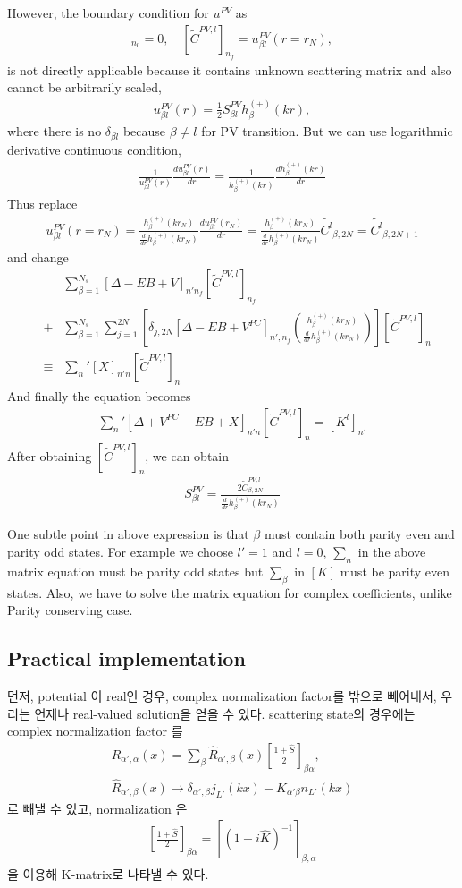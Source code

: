 \documentclass[10pt]{book}
\newcommand{\bea}{\begin{eqnarray}}
\newcommand{\eea}{\end{eqnarray}}
\newcommand{\no}{\nonumber \\}
\begin{document}
However, the boundary condition for $u^{PV}$ as   
\bea 
[\tilde{C}^{PV,l}]_{n_0}=0, \quad [\tilde{C}^{PV,l}]_{n_f}=u^{PV}_{\beta l}(r=r_N),
\eea 
is not directly applicable because it contains unknown scattering matrix
and also cannot be arbitrarily scaled,
\bea 
u^{PV}_{\beta l}(r)=\frac{1}{2}S^{PV}_{\beta l} h^{(+)}_{\beta}(kr),
\eea 
where there is no $\delta_{\beta l}$ because $\beta\neq l$ for PV transition.
But we can use logarithmic derivative continuous condition,
\bea 
\frac{1}{u^{PV}_{\beta l}(r)}\frac{d u^{PV}_{\beta l}(r)}{dr}
=\frac{1}{ h^{(+)}_{\beta}(kr)}
 \frac{d h^{(+)}_{\beta}(kr)}{dr}
\eea 
Thus replace
\bea 
u^{PV}_{\beta l}(r=r_N)=\frac{h^{(+)}_{\beta}(kr_N)  }{ \frac{d }{dr}h^{(+)}_{\beta}(kr_N)} 
                       \frac{d u^{PV}_{\beta l}(r_N)}{dr}
                       =\frac{h^{(+)}_{\beta}(kr_N)  }{ \frac{d }{dr}h^{(+)}_{\beta}(kr_N)}
                       \tilde{C^l}_{\beta,2N} =\tilde{C^l}_{\beta,2N+1} 
\eea 
and change 
\bea 
& &\sum_{\beta=1}^{N_{s}}[\Delta -E B +V]_{n'n_f}[\tilde{C}^{PV,l}]_{n_f} \no 
&+&\sum_{\beta=1}^{N_s}\sum_{j=1}^{2N} \left[ \delta_{j,2N}
   [\Delta-E B+V^{PC}]_{n',n_f} 
   \left(\frac{h^{(+)}_{\beta}(kr_N)  }{ \frac{d }{dr}h^{(+)}_{\beta}(kr_N)}\right) 
   \right] 
   [\tilde{C}^{PV,l}]_{n} \no 
&\equiv& {\sum_{n}}'[X]_{n'n}[\tilde{C}^{PV,l}]_{n}   
\eea 
And finally the equation becomes
\bea 
{\sum_n}' [\Delta+V^{PC}- E B+X]_{n'n}[\tilde{C}^{PV,l}]_{n}=[K^l]_{n'}
\eea 
After obtaining $[\tilde{C}^{PV,l}]_{n}$, we can obtain 
\bea 
S^{PV}_{\beta l}=\frac{ 2 \tilde{C}^{PV,l}_{\beta,2N} }{ \frac{d }{dr}h^{(+)}_{\beta}(kr_N)}
\eea 

One subtle point in above expression is that $\beta$ must contain 
both parity even and parity odd states. For example we choose
$l'=1$ and $l=0$, $\sum_{n}$ in the above matrix equation 
must be parity odd states but $\sum_{\beta}$ in $[K]$ must be parity even states.
Also, we have to solve the matrix equation for complex coefficients, unlike Parity conserving case.

\subsection{Practical implementation }
먼저, potential 이 real인 경우, complex normalization factor를 밖으로 빼어내서, 
우리는 언제나 real-valued solution을 얻을 수 있다. scattering state의 경우에는 complex 
normalization factor 를 
\bea
\label{spline:interp} 
R_{\alpha',\alpha}(x)=\sum_{\beta} \hat{R}_{\alpha',\beta}(x)[\frac{1+\hat{S}}{2}]_{\beta\alpha},
\no 
\hat{R}_{\alpha',\beta}(x)\to \delta_{\alpha',\beta} j_{L'}(kx)
                             -\hat{K}_{\alpha'\beta} n_{L'}(kx) 
\eea 
로 빼낼 수 있고, normalization 은 
\bea 
\label{spline:SK}
[\frac{1+\hat{S}}{2}]_{\beta\alpha}=[(1-i\hat{K})^{-1}]_{\beta,\alpha}
\eea 
을 이용해  K-matrix로 나타낼 수 있다. 
\end{document}
